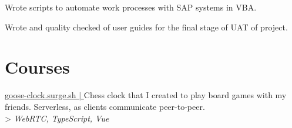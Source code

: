 \documentclass[]{deedy-resume-openfont}
\begin{document}
\begin{minipage}[t]{0.66\textwidth}
\begin{tightemize}
\item Wrote scripts to automate work processes with SAP systems in VBA.
\item Wrote and quality checked of user guides for the final stage of UAT of project.
\end{tightemize}
\sectionsep


\section{Courses}
\href{goose-clock.surge.sh}{goose-clock.surge.sh | }
Chess clock that I created to play board games with my friends. Serverless, as clients communicate peer-to-peer. \\
> \emph{WebRTC, TypeScript, Vue}
\sectionsep

\end{minipage} 
\end{document}
